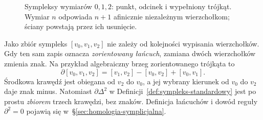 \begin{figure}[!htbp]
\centering
{}
\caption{Sympleksy wymiarów $0,1,2$: punkt,
odcinek i wypełniony trójkąt. Wymiar
$n$ odpowiada $n+1$ afinicznie niezależnym
wierzchołkom; ściany powstają przez ich usunięcie.}
\label{fig:sympleks-trojkat}
\end{figure}

\begin{uwaga}
\label{uwaga:orientacja-przed-homologia}
Jako zbiór sympleks $[v_0,v_1,v_2]$ nie zależy
od kolejności wypisania wierzchołków.
Gdy ten sam zapis oznacza \emph{zorientowany łańcuch},
zamiana dwóch wierzchołków zmienia znak.
Na przykład algebraiczny brzeg zorientowanego trójkąta to
\[
 \partial[v_0,v_1,v_2]
 =[v_1,v_2]-[v_0,v_2]+[v_0,v_1].
\]
Środkowa krawędź jest obiegana od $v_2$ do $v_0$,
a jej wybrany kierunek od $v_0$ do $v_2$ daje znak minus.
Natomiast $\partial\Delta^2$ w Definicji~\ref{def:sympleks-standardowy}
jest po prostu \emph{zbiorem} trzech krawędzi, bez znaków.
Definicja łańcuchów i dowód reguły $\partial^2=0$
pojawią się w~\S\ref{sec:homologia-symplicjalna}.
\end{uwaga}

